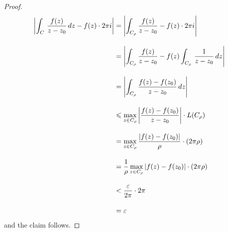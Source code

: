\begin{proof}
\begin{align*}
\left\lvert\int_C\,\frac{f(z)}{z - z_0}\,dz - f(z)\cdot 2\pi i\right\rvert &= \left\lvert\int_{C_\rho}\frac{f(z)}{z - z_0} - f(z)\cdot 2\pi i\right\rvert\\[1em]
 &= \left\lvert\int_{C_{\rho}}\frac{f(z)}{z - z_0} - f(z)\int_{C_{\rho}}\,\frac{1}{z - z_0}\,dz\right\rvert\\[1em]
 &= \left\lvert\int_{C_{\rho}}\frac{f(z) - f(z_0)}{z - z_0}\,dz\right\rvert\\[1em]
 &\leqslant \max_{z \in C_{\rho}}\left\lvert\frac{f(z) - f(z_0)}{z - z_0}\right\rvert\cdot L(C_{\rho})\\[1em]
 &= \max_{z \in C_{\rho}}\frac{\left\lvert f(z) - f(z_0)\right\rvert}{\rho}\cdot (2\pi\rho)\\[1em]
 &= \frac{1}{\rho}\max_{z \in C_{\rho}}\left\lvert f(z) - f(z_0)\right\rvert\cdot (2\pi\rho)\\[1em]
 &< \frac{\varepsilon}{2\pi}\cdot 2\pi\\[1em]
 &= \varepsilon
\end{align*}
and the claim follows.
\end{proof}

\medskip

